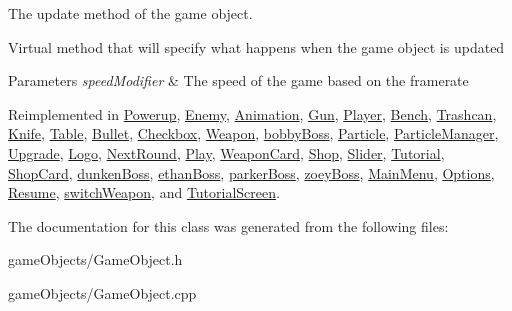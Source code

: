 The update method of the game object. 

Virtual method that will specify what happens when the game object is updated 
\begin{DoxyParams}{Parameters}
{\em speed\+Modifier} & The speed of the game based on the framerate \\
\hline
\end{DoxyParams}


Reimplemented in \hyperlink{class_powerup_a9e2f40a979bbc15787a607871b6644ce}{Powerup}, \hyperlink{class_enemy_a5509b06f70a649c4ea9d1fb06f07cb5c}{Enemy}, \hyperlink{class_animation_ae17ebf5f4b47801e460eb63342d858e8}{Animation}, \hyperlink{class_gun_ae7cbc34b103c1e89b4536309582dafb5}{Gun}, \hyperlink{class_player_a70e7b6ef62c5b8080e454edcb15cacc8}{Player}, \hyperlink{class_bench_abb815aa9afeee6e72fa93db3d51cf1a1}{Bench}, \hyperlink{class_trashcan_a6d44d844ec5c4155158b4e4d5fc222a4}{Trashcan}, \hyperlink{class_knife_ac861c5829858e00f82cbfdddb4a7d0b4}{Knife}, \hyperlink{class_table_af37e903447fa51718b7ad49dd2d4dbc3}{Table}, \hyperlink{class_bullet_acfcfcf7146d04ad78520292c55ca6eee}{Bullet}, \hyperlink{class_checkbox_af8103187e6df3f44b010a098d7473b55}{Checkbox}, \hyperlink{class_weapon_a098b1074ff1099e9fbd83d1186b8f18f}{Weapon}, \hyperlink{classbobby_boss_a1ba19c55017f2fb3f0b1679d82095d78}{bobby\+Boss}, \hyperlink{class_particle_a9bd18a091946b1814f685118dfe66a1e}{Particle}, \hyperlink{class_particle_manager_a2c786926fc1cd9992c518b3ea4ee07cb}{Particle\+Manager}, \hyperlink{class_upgrade_a66b04bde03bdf6ad0935b98963619444}{Upgrade}, \hyperlink{class_logo_a3c7f6eb9479e2594652d2a2f60c77e21}{Logo}, \hyperlink{class_next_round_ab6c2cb6a601f19c9898f962973c765c2}{Next\+Round}, \hyperlink{class_play_ae8b65105669a71c09901aae7b7e6f764}{Play}, \hyperlink{class_weapon_card_a160dc14db9e74b67537e74fcbf0a6e75}{Weapon\+Card}, \hyperlink{class_shop_a80125375c97c1028281e9458885ac0f0}{Shop}, \hyperlink{class_slider_a762b3a7ca00a3a665a1aeceba2e54fac}{Slider}, \hyperlink{class_tutorial_aeaa7fe8ebcd65dc23ca2df5c73ba5a48}{Tutorial}, \hyperlink{class_shop_card_a3f71274bdfc6c739969439975a3f0711}{Shop\+Card}, \hyperlink{classdunken_boss_ad9ae91ab3ce0b97ee48ab90203c7e4fd}{dunken\+Boss}, \hyperlink{classethan_boss_a6e47b12c5e718ecee5d888bcde580c1a}{ethan\+Boss}, \hyperlink{classparker_boss_a5f82194f8880924981fccd4bf611f324}{parker\+Boss}, \hyperlink{classzoey_boss_aa712b8f9050e3851cb0133927acd3f54}{zoey\+Boss}, \hyperlink{class_main_menu_a41b86746c468d18532123dfda01425de}{Main\+Menu}, \hyperlink{class_options_aa331e18456d83724b67f94a0827118c4}{Options}, \hyperlink{class_resume_a79207ae2fa394f8a2d0754fef119854d}{Resume}, \hyperlink{classswitch_weapon_a63fe71ba783dce920b6180efb2258735}{switch\+Weapon}, and \hyperlink{class_tutorial_screen_a67f9d997c5702c3ee032d7070d6363ec}{Tutorial\+Screen}.



The documentation for this class was generated from the following files\+:\begin{DoxyCompactItemize}
\item 
game\+Objects/Game\+Object.\+h\item 
game\+Objects/Game\+Object.\+cpp\end{DoxyCompactItemize}
